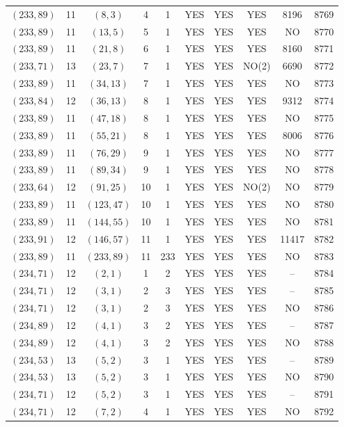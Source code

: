 \begin{longtable}{|c|c|c|c|c|c|c|c|c|c|}
$(233, 89)$ & 11 & $(8, 3)$ & 4 & 1 & YES & YES & YES & 8196 & 8769\\
$(233, 89)$ & 11 & $(13, 5)$ & 5 & 1 & YES & YES & YES & NO & 8770\\
$(233, 89)$ & 11 & $(21, 8)$ & 6 & 1 & YES & YES & YES & 8160 & 8771\\
$(233, 71)$ & 13 & $(23, 7)$ & 7 & 1 & YES & YES & NO(2) & 6690 & 8772\\
$(233, 89)$ & 11 & $(34, 13)$ & 7 & 1 & YES & YES & YES & NO & 8773\\
$(233, 84)$ & 12 & $(36, 13)$ & 8 & 1 & YES & YES & YES & 9312 & 8774\\
$(233, 89)$ & 11 & $(47, 18)$ & 8 & 1 & YES & YES & YES & NO & 8775\\
$(233, 89)$ & 11 & $(55, 21)$ & 8 & 1 & YES & YES & YES & 8006 & 8776\\
$(233, 89)$ & 11 & $(76, 29)$ & 9 & 1 & YES & YES & YES & NO & 8777\\
$(233, 89)$ & 11 & $(89, 34)$ & 9 & 1 & YES & YES & YES & NO & 8778\\
$(233, 64)$ & 12 & $(91, 25)$ & 10 & 1 & YES & YES & NO(2) & NO & 8779\\
$(233, 89)$ & 11 & $(123, 47)$ & 10 & 1 & YES & YES & YES & NO & 8780\\
$(233, 89)$ & 11 & $(144, 55)$ & 10 & 1 & YES & YES & YES & NO & 8781\\
$(233, 91)$ & 12 & $(146, 57)$ & 11 & 1 & YES & YES & YES & 11417 & 8782\\
$(233, 89)$ & 11 & $(233, 89)$ & 11 & 233 & YES & YES & YES & NO & 8783\\
$(234, 71)$ & 12 & $(2, 1)$ & 1 & 2 & YES & YES & YES & -- & 8784\\
$(234, 71)$ & 12 & $(3, 1)$ & 2 & 3 & YES & YES & YES & -- & 8785\\
$(234, 71)$ & 12 & $(3, 1)$ & 2 & 3 & YES & YES & YES & NO & 8786\\
$(234, 89)$ & 12 & $(4, 1)$ & 3 & 2 & YES & YES & YES & -- & 8787\\
$(234, 89)$ & 12 & $(4, 1)$ & 3 & 2 & YES & YES & YES & NO & 8788\\
$(234, 53)$ & 13 & $(5, 2)$ & 3 & 1 & YES & YES & YES & -- & 8789\\
$(234, 53)$ & 13 & $(5, 2)$ & 3 & 1 & YES & YES & YES & NO & 8790\\
$(234, 71)$ & 12 & $(5, 2)$ & 3 & 1 & YES & YES & YES & -- & 8791\\
$(234, 71)$ & 12 & $(7, 2)$ & 4 & 1 & YES & YES & YES & NO & 8792\\

\end{longtable}
